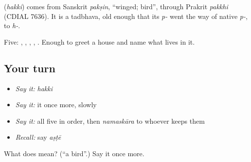 \begin{cousinweb}
\textbf{} (\emph{hakki}) comes from Sanskrit \emph{pakṣin}, \textquotedblleft{}winged; bird\textquotedblright{}, through Prakrit \emph{pakkhi} (CDIAL 7636). It is a tadbhava, old enough that its \emph{p-} went the way of native \emph{p-}, to \emph{h-}.
\end{cousinweb}

\begin{grammarlens}[title={What you've built}]
Five: , , , , . Enough to greet a house and name what lives in it.
\end{grammarlens}

\subsection*{Your turn}
\begin{itemize}
\raggedright
  \item \emph{Say it:} \emph{hakki}
  \item \emph{Say it:} it once more, slowly
  \item \emph{Say it:} all five in order, then \emph{namaskāra} to whoever keeps them
  \item \emph{Recall:} say \emph{aṣṭē}
\end{itemize}

\begin{tcolorbox}[breakable,colback=teal!4,colframe=teal!35!black,title={Before you move on}]
What does  mean? (\textquotedblleft{}a bird\textquotedblright{}.) Say it once more.
\end{tcolorbox}
